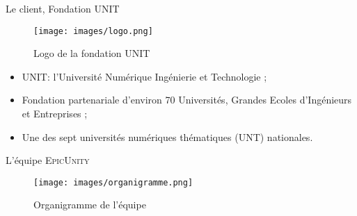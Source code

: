 \begin{frame}{Le client, Fondation UNIT}

\begin{figure}
\centering
\texttt{[image: images/logo.png]}
\caption{Logo de la fondation UNIT}
\end{figure}

\begin{itemize}
  \pause
  \item UNIT: l'Université Numérique Ingénierie et Technologie ;
  \pause
  \item Fondation partenariale d'environ 70 Universités, Grandes Ecoles d'Ingénieurs et Entreprises ;
  \pause
  \item Une des sept universités numériques thématiques (UNT) nationales.

\end{itemize}
	
\end{frame}

\begin{frame}{L'équipe \textsc{EpicUnity}}
	
	\begin{figure}
	\centering
	\texttt{[image: images/organigramme.png]}
	\caption{Organigramme de l'équipe}
	\end{figure}
	
\end{frame}
